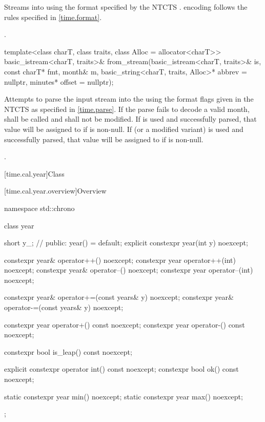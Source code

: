 \begin{itemdescr}
\pnum
\effects
Streams  into  using
the format specified by the NTCTS .
 encoding follows the rules specified in \ref{time.format}.

\pnum
\returns {}.
\end{itemdescr}

%
\begin{itemdecl}
template<class charT, class traits, class Alloc = allocator<charT>>
  basic_istream<charT, traits>&
    from_stream(basic_istream<charT, traits>& is, const charT* fmt,
                month& m, basic_string<charT, traits, Alloc>* abbrev = nullptr,
                minutes* offset = nullptr);
\end{itemdecl}

\begin{itemdescr}
\pnum
\effects
Attempts to parse the input stream 
into the   using
the format flags given in the NTCTS 
as specified in \ref{time.parse}.
If the parse fails to decode a valid month,
 shall be called
and  shall not be modified.
If  is used and successfully parsed,
that value will be assigned to  if  is non-null.
If  (or a modified variant) is used and successfully parsed,
that value will be assigned to  if  is non-null.

\pnum
\returns {}.
\end{itemdescr}

[time.cal.year]{Class }

[time.cal.year.overview]{Overview}

\begin{codeblock}
namespace std::chrono {
  class year {
    short y_;                   // \expos
  public:
    year() = default;
    explicit constexpr year(int y) noexcept;

    constexpr year& operator++()    noexcept;
    constexpr year  operator++(int) noexcept;
    constexpr year& operator--()    noexcept;
    constexpr year  operator--(int) noexcept;

    constexpr year& operator+=(const years& y) noexcept;
    constexpr year& operator-=(const years& y) noexcept;

    constexpr year operator+() const noexcept;
    constexpr year operator-() const noexcept;

    constexpr bool is_leap() const noexcept;

    explicit constexpr operator int() const noexcept;
    constexpr bool ok() const noexcept;

    static constexpr year min() noexcept;
    static constexpr year max() noexcept;
  };
}
\end{codeblock}

